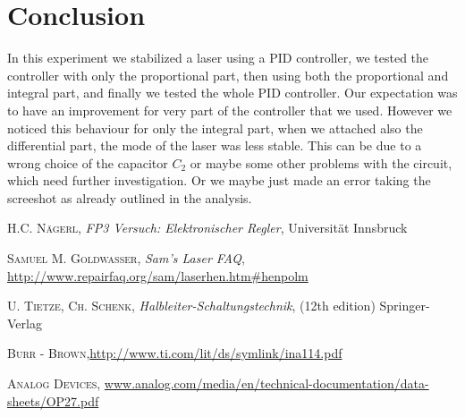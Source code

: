 \documentclass[a4paper,10pt]{article}
\begin{document}
\section{Conclusion}

In this experiment we stabilized a laser using a PID controller, we tested the controller with only the proportional part, then using both the proportional and integral part, and finally we tested the whole PID controller. Our expectation was to have an improvement for very part of the controller that we used. However we noticed this behaviour for only the integral part, when we attached also the differential part, the mode of the laser was less stable. This can be due to a wrong choice of the capacitor $C_2$ or maybe some other problems with the circuit, which need further investigation. Or we maybe just made an error taking the screeshot as already outlined in the analysis.


\begin{thebibliography}{99}
\textsc{H.C. Nägerl}, \textit{FP3 Versuch: Elektronischer Regler}, Universität Innsbruck

\textsc{Samuel M. Goldwasser}, \textit{Sam's Laser FAQ}, \url{http://www.repairfaq.org/sam/laserhen.htm#henpolm}

\textsc{U. Tietze, Ch. Schenk}, \textit{Halbleiter-Schaltungstechnik}, (12th edition) Springer-Verlag

\textsc{Burr - Brown},\url{http://www.ti.com/lit/ds/symlink/ina114.pdf}

\textsc{Analog Devices}, \url{www.analog.com/media/en/technical-documentation/data-sheets/OP27.pdf}
\end{thebibliography}
\end{document}
